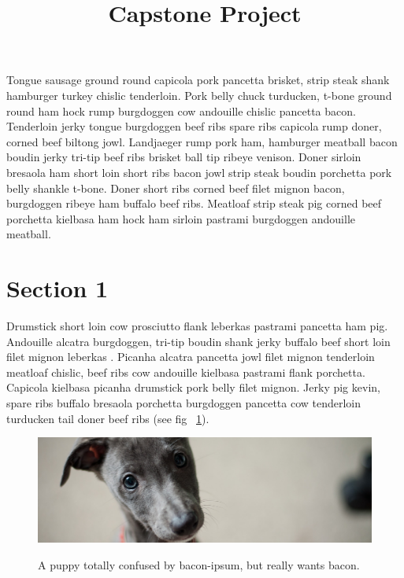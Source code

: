 \documentclass[man,floatsintext]{apa7}
\begin{document}
\title{Capstone Project}
\shorttitle{}





\maketitle
Tongue sausage ground round capicola pork pancetta brisket, strip steak shank hamburger turkey chislic tenderloin. Pork belly chuck turducken, t-bone ground round ham hock rump burgdoggen cow andouille chislic pancetta bacon. Tenderloin jerky tongue burgdoggen beef ribs spare ribs capicola rump doner, corned beef biltong jowl. Landjaeger rump pork ham, hamburger meatball bacon boudin jerky tri-tip beef ribs brisket ball tip ribeye venison. Doner sirloin bresaola ham short loin short ribs bacon jowl strip steak boudin porchetta pork belly shankle t-bone. Doner short ribs corned beef filet mignon bacon, burgdoggen ribeye ham buffalo beef ribs. Meatloaf strip steak pig corned beef porchetta kielbasa ham hock ham sirloin pastrami burgdoggen andouille meatball.

\newpage

\section{Section 1}

Drumstick short loin cow prosciutto flank leberkas pastrami pancetta ham pig. Andouille alcatra burgdoggen, tri-tip boudin shank jerky buffalo beef short loin filet mignon leberkas \parencite{RN175} . Picanha alcatra pancetta jowl filet mignon tenderloin meatloaf chislic, beef ribs cow andouille kielbasa pastrami flank porchetta. Capicola kielbasa picanha drumstick pork belly filet mignon. Jerky pig kevin, spare ribs buffalo bresaola porchetta burgdoggen pancetta cow tenderloin turducken tail doner beef ribs (see fig ~\ref{fig:my_fig}). 

\begin{figure}[!ht]
  \centering
  \caption{A puppy totally confused by bacon-ipsum, but really wants bacon.}
  \includegraphics[width=\textwidth]{dog.jpg}
  \label{fig:my_fig}
\end{figure}

\printbibliography
\end{document}
